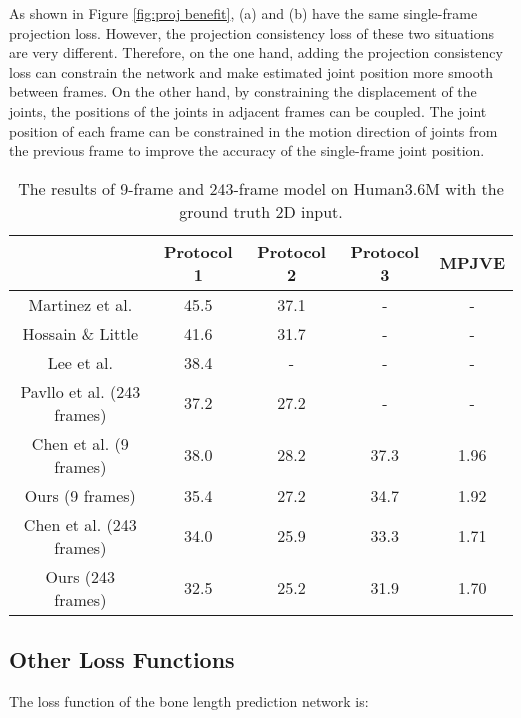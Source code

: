 \documentclass[journal]{IEEEtran}
\begin{document}
As shown in Figure \ref{fig:proj benefit}, (a) and (b) have the same single-frame projection loss. However,  the projection consistency loss of these two situations are very different. Therefore, on the one hand, adding the projection consistency loss can constrain the network and make estimated joint position more smooth between frames. On the other hand, by constraining the displacement of the joints, the positions of the joints in adjacent frames can be coupled. The joint position of each frame can be constrained in the motion direction of joints from the previous frame to improve the accuracy of the single-frame joint position.


\begin{table}[t]
	\centering
\resizebox{1.00\columnwidth}{!}
	{
		\begin{tabular}{|c|c|c|c|c|}
			\hline
			& Protocol 1 & Protocol 2 & Protocol 3 & MPJVE \\ \hline
			Martinez et al. \cite{Martinez_2017_ICCV}  & 45.5  & 37.1 & - & - \\
			Hossain \& Little \cite{hossain2018exploiting} & 41.6 & 31.7 & -  & - \\
			Lee et al. \cite{2018Propagating} &38.4 & - & - & - \\
			Pavllo et al.  \cite{20183D} (243 frames) &37.2  & 27.2 & - & - \\ \hline 
			Chen et al.  \cite{2020Anatomy} (9 frames)   & 38.0       & 28.2       & 37.3       & 1.96     \\
			Ours (9 frames)          & 35.4       & 27.2       & 34.7       & 1.92     \\ \hline
			Chen et al.  \cite{2020Anatomy} (243 frames) & 34.0       & 25.9       & 33.3       & 1.71     \\
			Ours (243 frames)        & 32.5       & 25.2       & 31.9       & 1.70     \\ \hline
		\end{tabular}
	}
	\vspace{-0pt}
	\caption{The results of 9-frame and 243-frame model on Human3.6M with the ground truth 2D input.}
	\label{table:gt}
	\vspace{-0pt}
\end{table} 





\subsection{Other Loss Functions}
\label{subsection:3.4}
The loss function of the bone length prediction network is:
\end{document}
